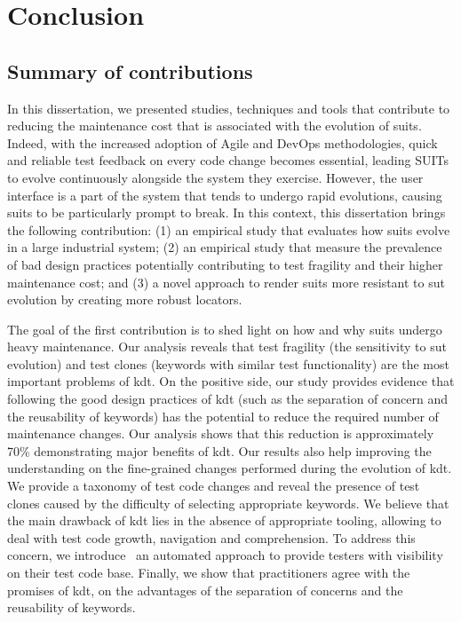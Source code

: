 \chapter{Conclusion}
\label{chap:conclusion}


\section{Summary of contributions}

In this dissertation, we presented studies, techniques and tools that contribute to reducing the maintenance cost that is associated with the evolution of \gls{suit}s. Indeed, with the increased adoption of Agile and DevOps methodologies, quick and reliable test feedback on every code change becomes essential, leading SUITs to evolve continuously alongside the system they exercise. However,  the user interface is a part of the system that tends to undergo rapid evolutions, causing \gls{suit}s to be particularly prompt to break. In this context, this dissertation brings the following contribution: (1) an empirical study that evaluates how \gls{suit}s evolve in a large industrial system; (2) an empirical study that measure the prevalence of bad design practices potentially contributing to test fragility and their higher maintenance cost; and (3) a novel approach to render \gls{suit}s more resistant to \gls{sut} evolution by creating more robust locators.

The goal of the first contribution is to shed light on how and why \gls{suit}s undergo heavy maintenance. Our analysis reveals that test fragility (the sensitivity to \gls{sut} evolution) and test clones (keywords with similar test functionality) are the most important problems of \gls{kdt}. On the positive side, our study provides evidence that following the good design practices of \gls{kdt} (such as  the  separation of concern and the reusability of keywords) has the potential to reduce the required number of maintenance changes. Our analysis shows that this reduction is approximately 70\% demonstrating major benefits of \gls{kdt}. Our results also help improving the understanding on the fine-grained changes performed during the evolution of \gls{kdt}.  We provide a taxonomy of test code changes and reveal the presence of test clones caused by the difficulty of selecting appropriate keywords. We believe that the main drawback of \gls{kdt} lies in the absence of appropriate tooling, allowing to deal with test code growth, navigation and comprehension. To address this concern, we introduce \tool\, an automated approach to provide testers with visibility on their test code base. Finally, we show that practitioners agree with the promises of \gls{kdt}, on the advantages of the separation of concerns and the reusability of keywords. 


